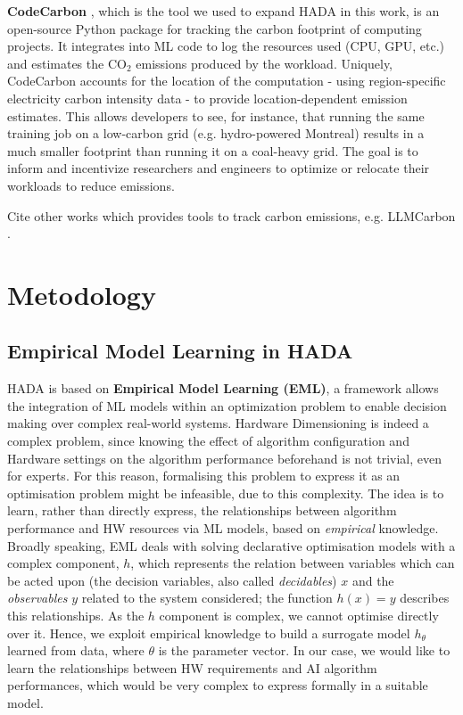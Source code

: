 \documentclass[a4paper,singleside,12pt]{report} %
\begin{document}
\textbf{CodeCarbon} \cite{courty2024codecarbon}, which is the tool we used to expand HADA in this work, 
is an open-source Python package for tracking the carbon footprint  of computing projects. It 
integrates into ML code to log the resources used (CPU, GPU, etc.) and estimates the $\mathrm{CO_2}$ emissions
produced by the workload. Uniquely, CodeCarbon accounts for the location of the computation - using 
region-specific electricity carbon intensity data - to provide location-dependent emission estimates. 
This allows developers to see, for instance, that running the same training job on a low-carbon grid 
(e.g. hydro-powered Montreal) results in a much smaller footprint than running it on a coal-heavy grid. 
The goal is to inform and incentivize researchers and engineers to optimize or relocate their workloads to 
reduce emissions.

Cite other works which provides tools to track carbon emissions, e.g. LLMCarbon 
\cite{faiz2024llmcarbon}.

\chapter{Metodology}

\section{Empirical Model Learning in HADA}

HADA is based on \textbf{Empirical Model Learning (EML)}, \cite{LOMBARDI2017343} a framework allows the integration of ML 
models within an optimization problem to enable decision making over complex real-world systems. Hardware Dimensioning is
indeed a complex problem, since knowing the effect of algorithm configuration and Hardware settings on the algorithm performance
beforehand is not trivial, even for experts. For this reason, formalising this problem to express it as an optimisation problem
might be infeasible, due to this complexity. The idea is to learn, rather than directly express, the relationships between 
algorithm performance and HW resources via ML models, based on \textit{empirical} knowledge.
Broadly speaking, EML deals with solving declarative optimisation models with a complex component, $h$, which represents 
the relation between variables which can be acted upon (the decision variables, also called \textit{decidables}) $x$ and 
the \textit{observables} $y$ related to the system considered; 
the function $h(x)=y$ describes this relationships. As the $h$ component is complex, we cannot 
optimise directly over it. Hence, we exploit empirical knowledge to build a surrogate model $h_{\theta}$ learned from data, 
where $\theta$ is the parameter vector. In our case, we would like to learn the relationships between HW requirements and
AI algorithm performances, which would be very complex to express formally in a suitable model.
\end{document}
